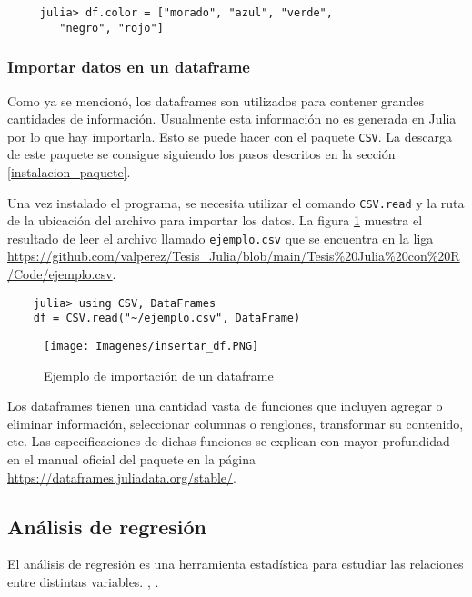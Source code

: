 \begin{verbatim}
     julia> df.color = ["morado", "azul", "verde", 
     	"negro", "rojo"]
\end{verbatim}

\subsubsection{Importar datos en un dataframe}

Como ya se mencionó, los dataframes son utilizados para contener grandes cantidades de información. Usualmente esta información no es generada en \textsf{Julia} por lo que hay importarla. Esto se puede hacer con el paquete \texttt{CSV}. La descarga de este paquete se consigue siguiendo  los pasos descritos en la sección \ref{instalacion_paquete}. 

Una vez instalado el programa, se necesita utilizar el comando \texttt{CSV.read} y la ruta de la ubicación del archivo para importar los datos. La figura \ref{insertar_df} muestra el resultado de leer el archivo llamado \texttt{ejemplo.csv} que se encuentra en la liga \url{https://github.com/valperez/Tesis_Julia/blob/main/Tesis%20Julia%20con%20R/Code/ejemplo.csv}. 

\begin{verbatim}
	julia> using CSV, DataFrames
	df = CSV.read("~/ejemplo.csv", DataFrame)
\end{verbatim}

\begin{figure}[h]
\begin{center}
\texttt{[image: Imagenes/insertar\_df.PNG]}
	\caption{Ejemplo de importación de un dataframe}
  \label{insertar_df}
\end{center}
\end{figure}

Los dataframes tienen una cantidad vasta de funciones que incluyen agregar o eliminar información, seleccionar columnas o renglones, transformar su contenido, etc. Las especificaciones de dichas funciones se explican con mayor profundidad en el manual oficial del paquete en la página \url{https://dataframes.juliadata.org/stable/}. 

\subsection{Análisis de regresión} \label{cap_regresiones}

El análisis de regresión es una herramienta estadística para estudiar las relaciones entre distintas variables. , \cite{regression_other_stories}. 


